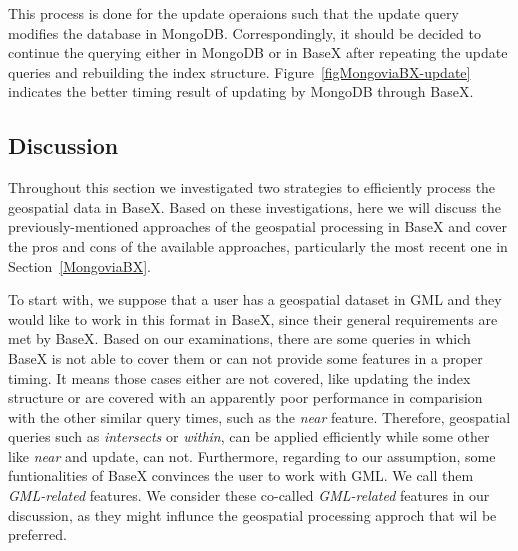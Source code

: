 \documentclass[a4paper,12pt]{article}
\begin{document}
This process is done for the update operaions such that the update query modifies the database in MongoDB. Correspondingly, it should be decided to continue the querying either in MongoDB or in BaseX after repeating the update queries and rebuilding the index structure. Figure~\ref{figMongoviaBX-update} indicates the better timing result of updating by MongoDB through BaseX. 

\subsection{Discussion}
\label{s.disc}
Throughout this section we investigated two strategies to efficiently process the geospatial data in BaseX. Based on these investigations, here we will discuss the  previously-mentioned approaches of the geospatial processing in BaseX and cover the pros and cons of the available approaches, particularly the most recent one in Section~\ref{MongoviaBX}. 

To start with, we suppose that a user has a geospatial dataset in GML and they would like to work in this format in BaseX, since their general requirements are met by BaseX. Based on our examinations, there are some queries in which BaseX is not able to cover them or can not provide some features in a proper timing. It means those cases either are not covered, like updating the index structure or are covered with an apparently poor performance in comparision with the other similar query times, such as the \textit{near} feature. Therefore, geospatial queries such as \textit{intersects} or \textit{within}, can be applied efficiently while some other like \textit{near} and update, can not. Furthermore, regarding to our assumption, some funtionalities of BaseX convinces the user to work with GML. We call them \textit{GML-related} features. We consider these co-called \textit{GML-related} features in our discussion, as they might influnce the geospatial processing approch that wil be preferred.

\end{document}

